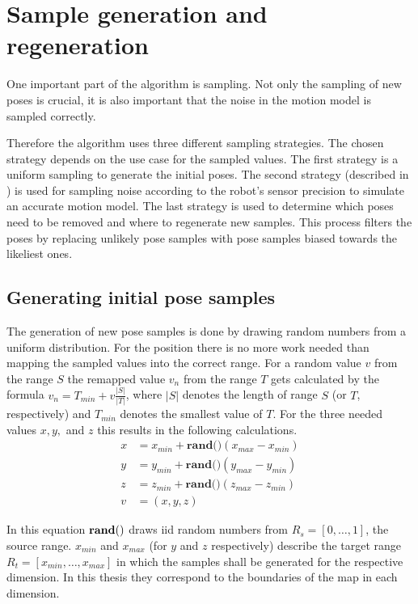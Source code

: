 \documentclass[Thesis.tex]{subfiles}
\begin{document}
\section{Sample generation and regeneration}

One important part of the algorithm is sampling. Not only the sampling of new poses is crucial, it is also important that the noise in the motion model is sampled correctly. 

Therefore the algorithm uses three different sampling strategies. The chosen strategy depends on the use case for the sampled values. The first strategy is a uniform sampling to generate the initial poses. The second strategy (described in ) is used for sampling noise according to the robot's sensor precision to simulate an accurate motion model. The last strategy is used to determine which poses need to be removed and where to regenerate new samples. This process filters the poses by replacing unlikely pose samples with pose samples biased towards the likeliest ones.

\subsection{Generating initial pose samples}\label{sec:init_samples}
The generation of new pose samples is done by drawing random numbers from a uniform distribution. For the position there is no more work needed than mapping the sampled values into the correct range. For a random value $v$ from the range $S$ the remapped value $v_n$ from the range $T$ gets calculated by the formula $v_n = T_{min} + v \frac{|S|}{|T|}$, where $|S|$ denotes the length of range $S$ (or $T$, respectively) and $T_{min}$ denotes the smallest value of $T$. For the three needed values $x, y,$ and $z$ this results in the following calculations.
%
\begin{align}
x &= x_{min} + \textbf{rand()} \left( x_{max} - x_{min} \right) \\
y &= y_{min} + \textbf{rand()} \left( y_{max} - y_{min} \right) \\
z &= z_{min} + \textbf{rand()} \left( z_{max} - z_{min} \right) \\
v &= (x, y, z)
\end{align}

In this equation ${\bf rand()}$ draws \gls{iid} random numbers from $R_s = \left[0, \dots, 1\right]$, the source range. $x_{min}$ and $x_{max}$ (for $y$ and $z$ respectively) describe the target range $R_t = \left[x_{min}, \dots, x_{max}\right]$ in which the samples shall be generated for the respective dimension. In this thesis they correspond to the boundaries of the map in each dimension.
\end{document}
